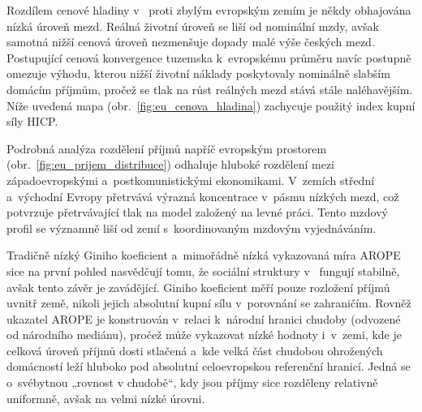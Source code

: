 Rozdílem cenové hladiny v~ proti zbylým evropským zemím je někdy obhajována nízká úroveň mezd. Reálná životní úroveň se liší od nominální mzdy, avšak samotná nižší cenová úroveň nezmenšuje dopady malé výše českých mezd. Postupující cenová konvergence tuzemska k~evropskému průměru navíc postupně omezuje výhodu, kterou nižší životní náklady poskytovaly nominálně slabším domácím příjmům, pročež se tlak na růst reálných mezd stává stále naléhavějším. Níže uvedená mapa (obr.~\ref{fig:eu_cenova_hladina}) zachycuje použitý index kupní síly HICP.\par



Podrobná analýza rozdělení příjmů napříč evropským prostorem (obr.~\ref{fig:eu_prijem_distribuce}) odhaluje hluboké rozdělení mezi západoevropskými a~postkomunistickými ekonomikami. V~zemích střední a~východní Evropy přetrvává výrazná koncentrace v~pásmu nízkých mezd, což potvrzuje přetrvávající tlak na model založený na levné práci. Tento mzdový profil se významně liší od zemí s~koordinovaným mzdovým vyjednáváním.\par




Tradičně nízký Giniho koeficient a~mimořádně nízká vykazovaná míra \acf{AROPE} sice na první pohled nasvědčují tomu, že sociální struktury v~ fungují stabilně, avšak tento závěr je zavádějící. Giniho koeficient měří pouze rozložení příjmů uvnitř země, nikoli jejich absolutní kupní sílu v~porovnání se zahraničím. Rovněž ukazatel \acs{AROPE} je konstruován v~relaci k~národní hranici chudoby (odvozené od národního mediánu), pročež může vykazovat nízké hodnoty i~v~zemi, kde je celková úroveň příjmů dosti stlačená a~kde velká část chudobou ohrožených domácností leží hluboko pod absolutní celoevropskou referenční hranicí. Jedná se o~svébytnou „rovnost v chudobě“, kdy jsou příjmy sice rozděleny relativně uniformně, avšak na velmi nízké úrovni.\par

